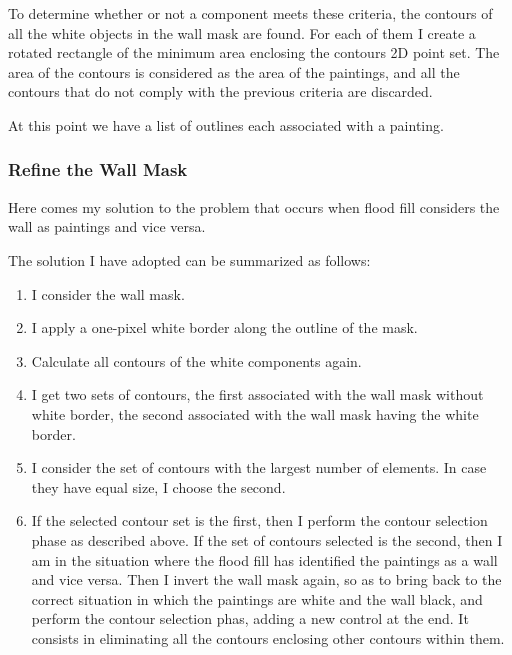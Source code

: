 \documentclass[10pt,twocolumn,letterpaper]{article}
\begin{document}
To determine whether or not a component meets these criteria, the contours of all the white objects in the wall mask are found. For each of them I create a rotated rectangle of the minimum area enclosing the contours 2D point set.
The area of ​​the contours is considered as the area of ​​the paintings, and all the contours that do not comply with the previous criteria are discarded.

At this point we have a list of outlines each associated with a painting.

\subsubsection{Refine the Wall Mask}

Here comes my solution to the problem that occurs when flood fill considers the wall as paintings and vice versa.

The solution I have adopted can be summarized as follows:
\begin{enumerate}
   \item I consider the wall mask.
   \item I apply a one-pixel white border along the outline of the mask.
   \item Calculate all contours of the white components again.
   \item I get two sets of contours, the first associated with the wall mask without white border, the second associated with the wall mask having the white border.
   \item I consider the set of contours with the largest number of elements. In case they have equal size, I choose the second.
   \item If the selected contour set is the first, then I perform the contour selection phase as described above. If the set of contours selected is the second, then I am in the situation where the flood fill has identified the paintings as a wall and vice versa. Then I invert the wall mask again, so as to bring back to the correct situation in which the paintings are white and the wall black, and perform the contour selection phas, adding a new control at the end. It consists in eliminating all the contours enclosing other contours within them.
\end{enumerate}
\end{document}
